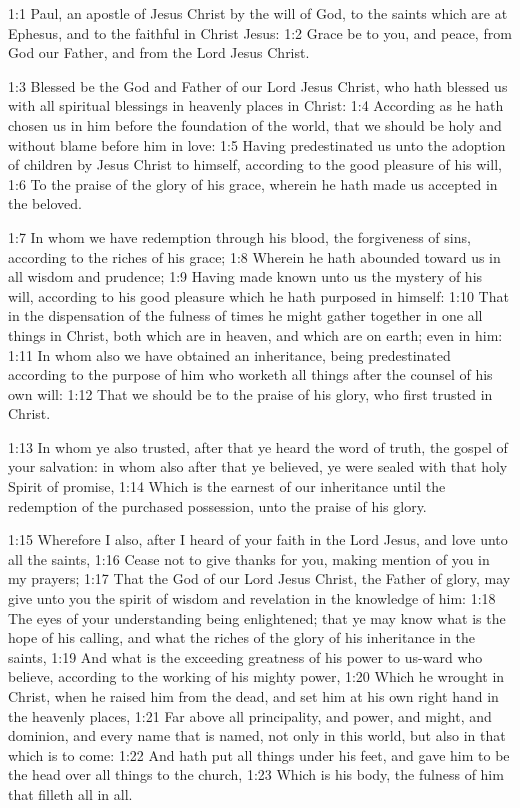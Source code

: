 

1:1 Paul, an apostle of Jesus Christ by the will of God, to the
saints which are at Ephesus, and to the faithful in Christ Jesus:
1:2 Grace be to you, and peace, from God our Father, and from the Lord
Jesus Christ.

1:3 Blessed be the God and Father of our Lord Jesus Christ, who hath
blessed us with all spiritual blessings in heavenly places in Christ:
1:4 According as he hath chosen us in him before the foundation of the
world, that we should be holy and without blame before him in love:
1:5 Having predestinated us unto the adoption of children by Jesus
Christ to himself, according to the good pleasure of his will, 1:6 To
the praise of the glory of his grace, wherein he hath made us accepted
in the beloved.

1:7 In whom we have redemption through his blood, the forgiveness of
sins, according to the riches of his grace; 1:8 Wherein he hath
abounded toward us in all wisdom and prudence; 1:9 Having made known
unto us the mystery of his will, according to his good pleasure which
he hath purposed in himself: 1:10 That in the dispensation of the
fulness of times he might gather together in one all things in Christ,
both which are in heaven, and which are on earth; even in him: 1:11 In
whom also we have obtained an inheritance, being predestinated
according to the purpose of him who worketh all things after the
counsel of his own will: 1:12 That we should be to the praise of his
glory, who first trusted in Christ.

1:13 In whom ye also trusted, after that ye heard the word of truth,
the gospel of your salvation: in whom also after that ye believed, ye
were sealed with that holy Spirit of promise, 1:14 Which is the
earnest of our inheritance until the redemption of the purchased
possession, unto the praise of his glory.

1:15 Wherefore I also, after I heard of your faith in the Lord Jesus,
and love unto all the saints, 1:16 Cease not to give thanks for you,
making mention of you in my prayers; 1:17 That the God of our Lord
Jesus Christ, the Father of glory, may give unto you the spirit of
wisdom and revelation in the knowledge of him: 1:18 The eyes of your
understanding being enlightened; that ye may know what is the hope of
his calling, and what the riches of the glory of his inheritance in
the saints, 1:19 And what is the exceeding greatness of his power to
us-ward who believe, according to the working of his mighty power,
1:20 Which he wrought in Christ, when he raised him from the dead, and
set him at his own right hand in the heavenly places, 1:21 Far above
all principality, and power, and might, and dominion, and every name
that is named, not only in this world, but also in that which is to
come: 1:22 And hath put all things under his feet, and gave him to be
the head over all things to the church, 1:23 Which is his body, the
fulness of him that filleth all in all.

